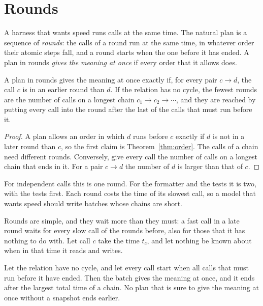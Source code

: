 \documentclass[acmsmall,nonacm,screen]{acmart}
\begin{document}
\section{Rounds}\label{sec:rounds}

A harness that wants speed runs calls at the same time. The natural plan is a sequence of
\emph{rounds}: the calls of a round run at the same time, in whatever order their atomic
steps fall, and a round starts when the one before it has ended. A plan in rounds
\emph{gives the meaning at once} if every order that it allows does.

\begin{theorem}[Rounds]\label{thm:rounds}
A plan in rounds gives the meaning at once exactly if, for every pair $c \to d$, the call
$c$ is in an earlier round than $d$. If the relation has no cycle, the fewest rounds are the
number of calls on a longest chain $c_1 \to c_2 \to \cdots$, and they are reached by putting
every call into the round after the last of the calls that must run before it.
\end{theorem}

\begin{proof}
A plan allows an order in which $d$ runs before $c$ exactly if $d$ is not in a later round
than $c$, so the first claim is Theorem~\ref{thm:order}. The calls of a chain need different
rounds. Conversely, give every call the number of calls on a longest chain that ends in it.
For a pair $c \to d$ the number of $d$ is larger than that of $c$.
\end{proof}

For independent calls this is one round. For the formatter and the tests it is two, with the
tests first. Each round costs the time of its slowest call, so a model that wants speed
should write batches whose chains are short.

Rounds are simple, and they wait more than they must: a fast call in a late round waits for
every slow call of the rounds before, also for those that it has nothing to do with. Let call
$c$ take the time $t_c$, and let nothing be known about when in that time it reads and
writes.

\begin{theorem}\label{thm:soon}
Let the relation have no cycle, and let every call start when all calls that must run before
it have ended. Then the batch gives the meaning at once, and it ends after the largest total
time of a chain. No plan that is sure to give the meaning at once without a snapshot ends
earlier.
\end{theorem}
\end{document}
